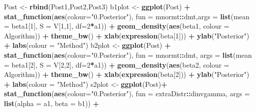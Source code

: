 \documentclass[
]{book}
\newenvironment{Shaded}{\begin{snugshade}}{\end{snugshade}}
\newcommand{\DataTypeTok}[1]{\textcolor[rgb]{0.13,0.29,0.53}{#1}}
\newcommand{\DecValTok}[1]{\textcolor[rgb]{0.00,0.00,0.81}{#1}}
\newcommand{\KeywordTok}[1]{\textcolor[rgb]{0.13,0.29,0.53}{\textbf{#1}}}
\newcommand{\NormalTok}[1]{#1}
\newcommand{\OperatorTok}[1]{\textcolor[rgb]{0.81,0.36,0.00}{\textbf{#1}}}
\newcommand{\StringTok}[1]{\textcolor[rgb]{0.31,0.60,0.02}{#1}}
\begin{document}
\begin{Shaded}
\begin{Highlighting}[]
\NormalTok{Post <-}\StringTok{ }\KeywordTok{rbind}\NormalTok{(Post1,Post2,Post3)}
\NormalTok{b1plot <-}\StringTok{ }\KeywordTok{ggplot}\NormalTok{(Post) }\OperatorTok{+}
\StringTok{  }\KeywordTok{stat_function}\NormalTok{(}\KeywordTok{aes}\NormalTok{(}\DataTypeTok{colour=}\StringTok{"0.Posterior"}\NormalTok{), }\DataTypeTok{fun =}\NormalTok{ mnormt}\OperatorTok{::}\NormalTok{dmt,}\DataTypeTok{args =} \KeywordTok{list}\NormalTok{(}\DataTypeTok{mean =}\NormalTok{ beta1[}\DecValTok{1}\NormalTok{], }\DataTypeTok{S =}\NormalTok{ V[}\DecValTok{1}\NormalTok{,}\DecValTok{1}\NormalTok{], }\DataTypeTok{df=}\DecValTok{2}\OperatorTok{*}\NormalTok{a1)) }\OperatorTok{+}
\StringTok{  }\KeywordTok{geom_density}\NormalTok{(}\KeywordTok{aes}\NormalTok{(beta1, }\DataTypeTok{colour =}\NormalTok{ Algorithm)) }\OperatorTok{+}\StringTok{ }\KeywordTok{theme_bw}\NormalTok{() }\OperatorTok{+}
\StringTok{  }\KeywordTok{xlab}\NormalTok{(}\KeywordTok{expression}\NormalTok{(beta[}\DecValTok{1}\NormalTok{])) }\OperatorTok{+}\StringTok{ }\KeywordTok{ylab}\NormalTok{(}\StringTok{"Posterior"}\NormalTok{) }\OperatorTok{+}\StringTok{ }\KeywordTok{labs}\NormalTok{(}\DataTypeTok{colour =} \StringTok{"Method"}\NormalTok{)}
\NormalTok{b2plot <-}\StringTok{ }\KeywordTok{ggplot}\NormalTok{(Post) }\OperatorTok{+}
\StringTok{  }\KeywordTok{stat_function}\NormalTok{(}\KeywordTok{aes}\NormalTok{(}\DataTypeTok{colour=}\StringTok{"0.Posterior"}\NormalTok{), }\DataTypeTok{fun =}\NormalTok{ mnormt}\OperatorTok{::}\NormalTok{dmt, }\DataTypeTok{args =} \KeywordTok{list}\NormalTok{(}\DataTypeTok{mean =}\NormalTok{ beta1[}\DecValTok{2}\NormalTok{], }\DataTypeTok{S =}\NormalTok{ V[}\DecValTok{2}\NormalTok{,}\DecValTok{2}\NormalTok{], }\DataTypeTok{df=}\DecValTok{2}\OperatorTok{*}\NormalTok{a1)) }\OperatorTok{+}
\StringTok{  }\KeywordTok{geom_density}\NormalTok{(}\KeywordTok{aes}\NormalTok{(beta2, }\DataTypeTok{colour =}\NormalTok{ Algorithm)) }\OperatorTok{+}\StringTok{ }\KeywordTok{theme_bw}\NormalTok{() }\OperatorTok{+}
\StringTok{  }\KeywordTok{xlab}\NormalTok{(}\KeywordTok{expression}\NormalTok{(beta[}\DecValTok{2}\NormalTok{])) }\OperatorTok{+}\StringTok{ }\KeywordTok{ylab}\NormalTok{(}\StringTok{"Posterior"}\NormalTok{) }\OperatorTok{+}\StringTok{ }\KeywordTok{labs}\NormalTok{(}\DataTypeTok{colour =} \StringTok{"Method"}\NormalTok{)}
\NormalTok{s2plot <-}\StringTok{ }\KeywordTok{ggplot}\NormalTok{(Post)}\OperatorTok{+}
\StringTok{  }\KeywordTok{stat_function}\NormalTok{(}\KeywordTok{aes}\NormalTok{(}\DataTypeTok{colour=}\StringTok{"0.Posterior"}\NormalTok{), }\DataTypeTok{fun =}\NormalTok{ extraDistr}\OperatorTok{::}\NormalTok{dinvgamma, }\DataTypeTok{args =} \KeywordTok{list}\NormalTok{(}\DataTypeTok{alpha =}\NormalTok{ a1, }\DataTypeTok{beta =}\NormalTok{ b1)) }\OperatorTok{+}

\end{Highlighting}
\end{Shaded}
\end{document}
